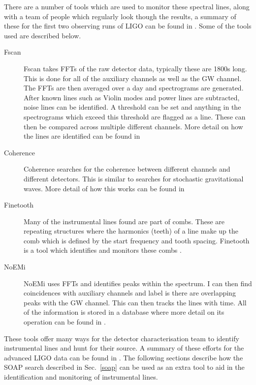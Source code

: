 There are a number of tools which are used to monitor these spectral lines, along with a team of people which regularly look though the results, a summary of these for the first two observing runs of \ac{LIGO} can be found in \citep{covas2018IdentificationMitigation}.
Some of the tools used are described below. 

\begin{description}
	\item[Fscan] Fscan \citep{coughlin2010NoiseLine} takes \acp{FFT} of the raw detector data, typically these are 1800s long. This is done for all of the auxiliary channels as well as the \ac{GW} channel. The \acp{FFT} are then averaged over a day and spectrograms are generated. After known lines such as Violin modes and power lines are subtracted, noise lines can be identified. A threshold can be set and anything in the spectrograms which exceed this threshold are flagged as a line. These can then be compared across multiple different channels. More detail on how the lines are identified can be found in \citep{coughlin2010NoiseLine}
	
	\item[Coherence] Coherence searches for the coherence between different channels and different detectors. This is similar to searches for stochastic gravitational waves. More detail of how this works can be found in \citep{covas2018IdentificationMitigation}
	
	\item[Finetooth] Many of the instrumental lines found are part of combs. These are repeating structures where the harmonics (teeth) of a line make up the comb which is defined by the start frequency and tooth spacing. Finetooth is a tool which identifies and monitors these combs \citep{}.
	
	\item[NoEMi] NoEMi uses \acp{FFT} and identifies peaks within the spectrum. I can then find coincidences with auxiliary channels and label is there are overlapping peaks with the \ac{GW} channel. This can then tracks the lines with time. All of the information is stored in a database where more detail on its operation can be found in \citep{accadia2012NoEMiNoise}.
	
\end{description}

These tools offer many ways for the detector characterisation team to identify instrumental lines and hunt for their source. A summary of these efforts for the advanced \ac{LIGO} data can be found in \citep{covas2018IdentificationMitigation}.
The following sections describe how the SOAP search described in Sec.~\ref{soap} can be used as an extra tool to aid in the identification and monitoring of instrumental lines.

